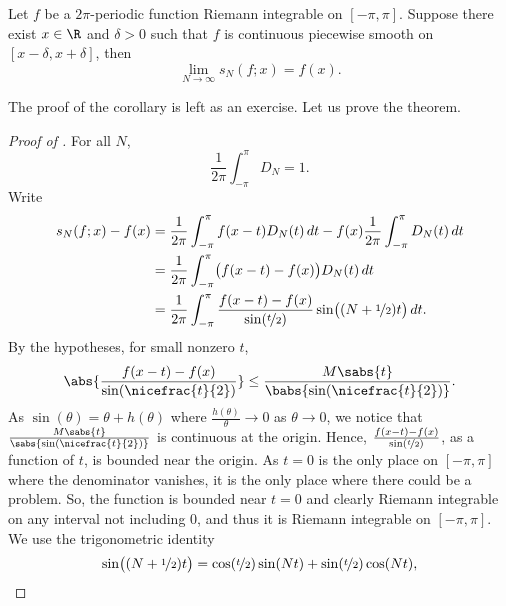 \begin{cor} \label{cor:fourierpiecewisesmooth}
Let $f$ be a $2\pi$-periodic function
Riemann integrable on $[-\pi,\pi]$.  Suppose
there exist $x\in \R$ and $\delta > 0$ such that $f$ is continuous piecewise
smooth on $[x-\delta,x+\delta]$, then
\begin{equation*}
\lim_{N \to \infty} s_N(f;x) = f(x) .
\end{equation*}
\end{cor}

The proof of the corollary is left as an exercise.  Let us prove the
theorem.

\begin{proof}[Proof of ]
For all $N$,
\begin{equation*}
\frac{1}{2\pi} \int_{-\pi}^\pi D_N = 1 .
\end{equation*}
Write
\begin{equation*}
\begin{split}
s_N(f;x)-f(x) & =
\frac{1}{2\pi} \int_{-\pi}^\pi f(x-t) D_N(t) \, dt 
-
f(x)
\frac{1}{2\pi} \int_{-\pi}^\pi D_N(t) \, dt
\\
& = 
\frac{1}{2\pi} \int_{-\pi}^\pi \bigl( f(x-t) - f(x) \bigr) D_N(t) \, dt 
\\
& = 
\frac{1}{2\pi} \int_{-\pi}^\pi \frac{f(x-t) - f(x)}{\sin(\nicefrac{t}{2})} \sin\bigl(
(N+\nicefrac{1}{2})t \bigr) \, dt .
\end{split}
\end{equation*}
By the hypotheses,
for small nonzero $t$,
\begin{equation*}
\abs{ \frac{f(x-t) - f(x)}{\sin(\nicefrac{t}{2})} }
\leq
\frac{M\sabs{t}}{\babs{\sin(\nicefrac{t}{2})}} .
\end{equation*}
As $\sin(\theta) = \theta + h(\theta)$ where $\frac{h(\theta)}{\theta} \to
0$ as $\theta \to 0$,
we notice that
$\frac{M\sabs{t}}{\sabs{\sin(\nicefrac{t}{2})}}$ is continuous at the
origin.
Hence,
$\frac{f(x-t) - f(x)}{\sin(\nicefrac{t}{2})}$, as a function of $t$,
is bounded near the origin.
As $t=0$ is the only place on $[-\pi,\pi]$ where the denominator vanishes,
it is the only place where there could be a problem.
So, the function is bounded near $t=0$ and clearly
Riemann integrable on any interval not including $0$, and thus
it is Riemann integrable on $[-\pi,\pi]$.
We use the trigonometric identity
\begin{equation*}
\sin\bigl( (N+\nicefrac{1}{2})t \bigr)
=
\cos(\nicefrac{t}{2}) \sin(Nt) + 
\sin(\nicefrac{t}{2}) \cos(Nt) ,
\end{equation*}

\end{proof}
